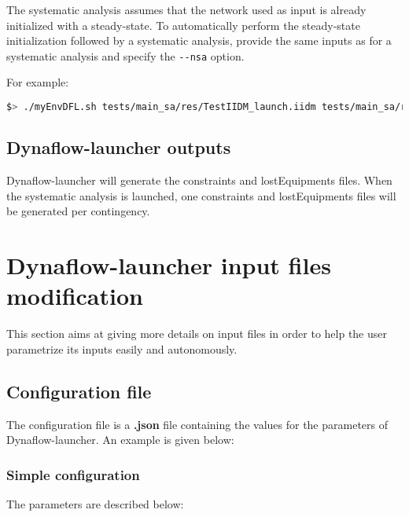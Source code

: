 \documentclass[a4paper, 12pt]{report}
\begin{document}
The systematic analysis assumes that the network used as input is already initialized with a steady-state.
To automatically perform the steady-state initialization followed by a systematic analysis, provide the same inputs as for a systematic analysis and specify the \texttt{-{}-nsa} option.

For example:

\begin{lstlisting}[language=bash, breaklines=true, breakatwhitespace=false, columns=fullflexible]
  $> ./myEnvDFL.sh tests/main_sa/res/TestIIDM_launch.iidm tests/main_sa/res/config_launch.json tests/main_sa/res/contingencies_launch.json --nsa
\end{lstlisting}

\subsection[Dynaflow-launcher outputs]{Dynaflow-launcher outputs}

Dynaflow-launcher will generate the constraints and lostEquipments files.
When the systematic analysis is launched, one constraints and lostEquipments files will be generated per contingency.

\section[Dynaflow-launcher input files modification]{Dynaflow-launcher input files modification}

This section aims at giving more details on input files in order to help the user parametrize its inputs easily and autonomously.

\subsection{Configuration file}
\label{Dynaflow_Launcher_Configuration_Configuration_File}

The configuration file is a \textbf{.json} file containing the values for the parameters of Dynaflow-launcher. An example is given below:

\subsubsection{Simple configuration}



The parameters are described below:
\end{document}
